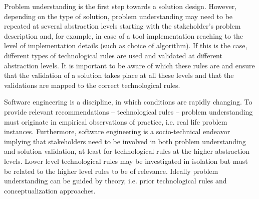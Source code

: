 \documentclass[graybox]{svmult}
\begin{document}

Problem understanding is the first step towards a solution design. However, depending on the type of solution, problem understanding may need to be repeated at several abstraction levels starting with the stakeholder's problem description and, for example, in case of a tool implementation reaching to the level of implementation details (such as  choice of algorithm). If this is the case, different types of technological rules are used and validated at different abstraction levels. It is important to be aware of which these rules are and ensure that the validation of a solution takes place at all these levels and that the validations are mapped to the correct technological rules. 

Software engineering is a discipline, in which conditions are rapidly changing. To provide relevant recommendations -- technological rules -- problem understanding must originate in empirical observations of practice, i.e. real life problem instances. Furthermore, software engineering is a socio-technical endeavor implying that stakeholders need to be involved in both problem understanding and solution validation, at least for technological rules at the higher abstraction levels. Lower level technological rules may be investigated in isolation but must be related to the higher level rules to be of relevance. 
Ideally problem understanding can be guided by theory, i.e. prior technological rules and conceptualization approaches. 





\end{document}
